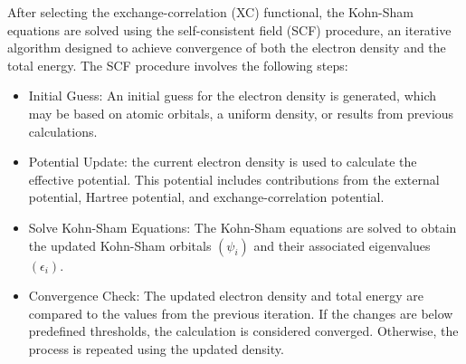 After selecting the exchange-correlation (XC) functional, the Kohn-Sham equations are solved using the self-consistent field (SCF) procedure, an iterative algorithm designed to achieve convergence of both the electron density and the total energy.
The SCF procedure involves the following steps:
\begin{itemize}
    \item[1] Initial Guess: An initial guess for the electron density is generated, which may be based on atomic orbitals, a uniform density, or results from previous calculations.
    \item[2] Potential Update: the current electron density is used to calculate the effective potential. This potential includes contributions from the external potential, Hartree potential, and exchange-correlation potential.
    \item[3] Solve Kohn-Sham Equations: The Kohn-Sham equations are solved to obtain the updated Kohn-Sham orbitals $(\psi_i)$ and their associated eigenvalues $(\epsilon_i)$.
    \item[4] Convergence Check: The updated electron density and total energy are compared to the values from the previous iteration. If the changes are below predefined thresholds, the calculation is considered converged. Otherwise, the process is repeated using the updated density. 
\end{itemize}

